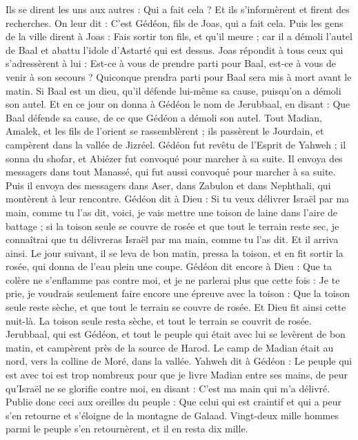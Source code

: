 \begin{multicols}{2}
Ils se dirent les uns aux autres : Qui a fait cela ? Et ils s’informèrent et firent des recherches. On leur dit : C’est Gédéon, fils de Joas, qui a  fait cela.
Puis les gens de la ville dirent à Joas : Fais sortir ton fils, et qu'il meure ; car il a démoli l'autel de Baal et abattu l'idole d'Astarté qui est dessus.
Joas répondit à tous ceux qui s'adressèrent à lui : Est-ce à vous de prendre parti pour Baal, est-ce à vous de venir à son secours ? Quiconque prendra parti pour Baal sera mis à mort avant le matin. Si Baal est un dieu, qu'il défende lui-même sa cause, puisqu'on a démoli son autel.
Et en ce jour on donna à Gédéon le nom de Jerubbaal, en disant : Que Baal défende sa cause, de ce que Gédéon a démoli son autel.
Tout Madian, Amalek, et les fils de l’orient se rassemblèrent ;  ils passèrent le Jourdain, et campèrent dans la vallée de Jizréel.
Gédéon fut revêtu de l'Esprit de Yahweh ; il sonna du shofar, et Abiézer fut convoqué pour marcher à sa suite.
Il envoya des messagers dans tout Manassé, qui fut aussi convoqué pour marcher à sa suite. Puis il envoya des messagers dans Aser, dans Zabulon et dans Nephthali, qui montèrent à leur rencontre.
Gédéon dit à Dieu : Si tu veux délivrer Israël par ma main, comme tu l'as dit,
voici, je vais mettre une toison de laine dans l'aire de battage ; si la toison seule se couvre de rosée et que tout le terrain reste sec, je connaîtrai que tu délivreras Israël par ma main, comme tu l’as dit.
Et il arriva ainsi. Le jour suivant, il se leva de bon matin, pressa la toison, et en fit sortir la rosée, qui donna de l’eau plein une coupe.
Gédéon dit encore à Dieu : Que ta colère ne s'enflamme pas contre moi, et je ne parlerai plus que cette fois : Je te prie, je voudrais seulement faire encore une épreuve avec la toison : Que la toison seule reste sèche, et que tout le terrain se couvre de rosée.
Et Dieu fit ainsi cette nuit-là. La toison seule resta sèche, et tout le terrain se couvrit de rosée.
\VerseOne{}Jerubbaal, qui est Gédéon, et tout le peuple qui était avec lui se levèrent de bon matin, et campèrent près de la source de Harod.  Le camp de Madian était au nord, vers la colline de Moré, dans la vallée.
Yahweh dit à Gédéon : Le peuple qui est avec toi est trop nombreux pour que je livre Madian entre ses mains, de peur qu'Israël ne se glorifie contre moi, en disant : C’est ma main qui m'a délivré.
Publie donc ceci aux oreilles du peuple : Que celui qui est craintif et qui a peur s’en retourne et s’éloigne de la montagne de Galaad. Vingt-deux mille hommes parmi le peuple s'en retournèrent, et il en resta dix mille.

\end{multicols}

